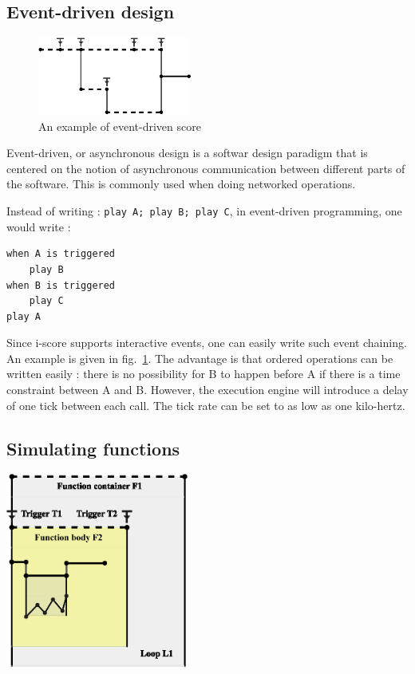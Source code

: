 \documentclass{article}
\begin{document}
\subsection{Event-driven design}
\begin{figure}
    \centering
    \includegraphics[width=0.45\textwidth]{images/event.eps}
    \caption{An example of event-driven score}
    \label{fig.event}
\end{figure}
Event-driven, or asynchronous design is a softwar design 
paradigm that is centered on the notion of asynchronous 
communication between different parts of the software.
This is commonly used when doing networked operations.

Instead of writing : 
\verb|play A; play B; play C|, in event-driven programming, one would write :
\begin{lstlisting}
when A is triggered
    play B
when B is triggered
    play C    
play A
\end{lstlisting}

Since i-score supports interactive events, one can easily write such event chaining.
An example is given in fig.~\ref{fig.event}. 
The advantage is that ordered operations can be written easily : there is no 
possibility for B to happen before A if there is a time constraint between A and B.
However, the execution engine will introduce a delay of one tick between each call.
The tick rate can be set to as low as one kilo-hertz.
\subsection{Simulating functions}
\includegraphics[width=0.45\textwidth]{images/function.eps}
\end{document}
